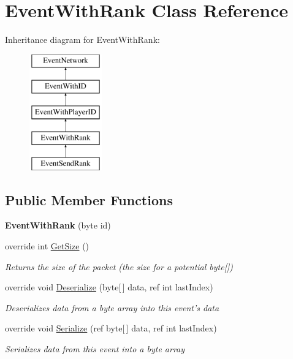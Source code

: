 \hypertarget{class_event_with_rank}{\section{Event\-With\-Rank Class Reference}
\label{class_event_with_rank}
}
Inheritance diagram for Event\-With\-Rank\-:\begin{figure}[H]
\begin{center}
\leavevmode
\includegraphics[height=5.000000cm]{class_event_with_rank}
\end{center}
\end{figure}
\subsection*{Public Member Functions}
\begin{DoxyCompactItemize}
\item 
\hypertarget{class_event_with_rank_a4d0549af46640d8030477954c4c78f55}{{\bfseries Event\-With\-Rank} (byte id)}\label{class_event_with_rank_a4d0549af46640d8030477954c4c78f55}

\item 
override int \hyperlink{class_event_with_rank_a06f136165bcc0c8f53a7d681377d3056}{Get\-Size} ()
\begin{DoxyCompactList}\small\item\em Returns the size of the packet (the size for a potential byte\mbox{[}\mbox{]}) \end{DoxyCompactList}\item 
override void \hyperlink{class_event_with_rank_a27b73f2ee4299dcc88960da8a5272a3d}{Deserialize} (byte\mbox{[}$\,$\mbox{]} data, ref int last\-Index)
\begin{DoxyCompactList}\small\item\em Deserializes data from a byte array into this event's data \end{DoxyCompactList}\item 
override void \hyperlink{class_event_with_rank_a590f1c4561dbc363ab6167101ba5139d}{Serialize} (ref byte\mbox{[}$\,$\mbox{]} data, ref int last\-Index)
\begin{DoxyCompactList}\small\item\em Serializes data from this event into a byte array \end{DoxyCompactList}\end{DoxyCompactItemize}
